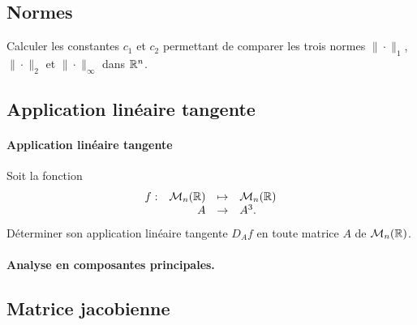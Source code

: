 \subsection{Normes}

\begin{exercise*}
  Calculer les constantes $c_1$ et $c_2$ permettant de comparer les trois normes $\|\cdot\|_1$, $\|\cdot\|_2$ et $\|\cdot\|_\infty$ dans $\mathbb{R}^n$.
\end{exercise*}
\solution{
}

\subsection{Application linéaire tangente}

\paragraph{Application linéaire tangente}
Soit la fonction
$$
\begin{array}{rrcl}
  f :  & \mathcal{M}_n(\mathbb{R}) & \mapsto & \mathcal{M}_n(\mathbb{R}) \\
  & A & \rightarrow & A^3.
\end{array}
$$
Déterminer son application linéaire tangente $D_A f$ en toute matrice $A$ de $\mathcal{M}_n(\mathbb{R})$.
\solution{\todo{}}

\paragraph{Analyse en composantes principales.}

\subsection{Matrice jacobienne}

